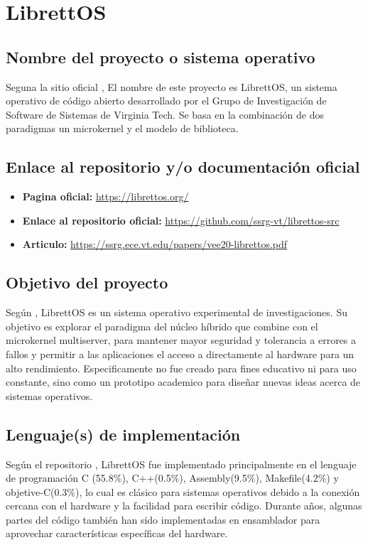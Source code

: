 \section{LibrettOS}
\subsection{Nombre del proyecto o sistema operativo}
Seguna la sitio oficial \citep{librettos_website_2021}, El nombre de este proyecto es LibrettOS, un sistema operativo de código abierto desarrollado por el Grupo de Investigación de Software de Sistemas de Virginia Tech. 
Se basa en la combinación de dos paradigmas un microkernel y el modelo de biblioteca.
\subsection{Enlace al repositorio y/o documentación oficial}
\begin{itemize}
    \item \textbf{Pagina oficial:} \url{https://librettos.org/}
    \item \textbf{Enlace al repositorio oficial:} \url{https://github.com/ssrg-vt/librettos-src}
    \item \textbf{Articulo:} \url{https://ssrg.ece.vt.edu/papers/vee20-librettos.pdf}
\end{itemize}

\subsection{Objetivo del proyecto}
Según \citep{nikolaev2021librettos}, LibrettOS es un sistema operativo experimental de investigaciones. Su objetivo es explorar el paradigma del núcleo híbrido que combine con el microkernel multiserver, para mantener mayor seguridad y tolerancia a errores a fallos y permitir a las aplicaciones el acceso a directamente al hardware para un alto rendimiento. Especificamente no fue creado para fines educativo ni para uso constante, sino como un prototipo academico para diseñar nuevas ideas acerca de sistemas operativos.
\subsection{Lenguaje(s) de implementación}
Según el repositorio \citep{repositorio_rumprun_github}, LibrettOS fue implementado principalmente en el lenguaje de programación C (55.8\%), C++(0.5\%), Assembly(9.5\%), Makefile(4.2\%) y objetive-C(0.3\%), lo cual es clásico para sistemas operativos debido a la conexión cercana con el hardware y la facilidad
para escribir código. Durante años, algunas partes del código también han sido implementadas en ensamblador para aprovechar características específicas del 
hardware. 
